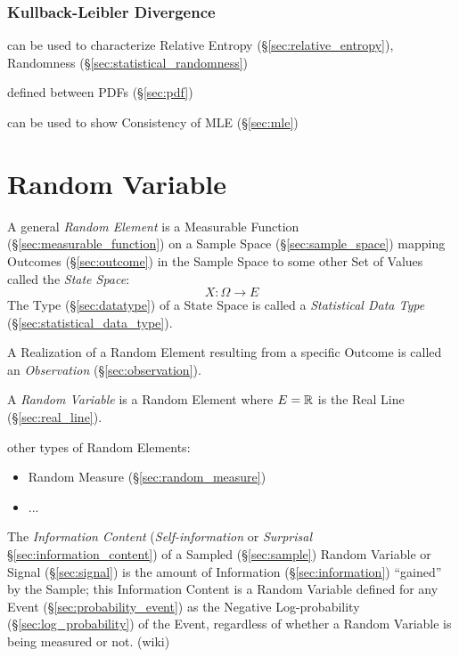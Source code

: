 \subsubsection{Kullback-Leibler Divergence}\label{sec:kullback_leibler}

can be used to characterize Relative Entropy (\S\ref{sec:relative_entropy}),
Randomness (\S\ref{sec:statistical_randomness})

defined between PDFs (\S\ref{sec:pdf})

can be used to show Consistency of MLE (\S\ref{sec:mle})



\section{Random Variable}\label{sec:random_variable}

A general \emph{Random Element} is a Measurable Function
(\S\ref{sec:measurable_function}) on a Sample Space (\S\ref{sec:sample_space})
mapping Outcomes (\S\ref{sec:outcome}) in the Sample Space to some other Set of
Values called the \emph{State Space}:
\[
  X : \Omega \rightarrow E
\]
The Type (\S\ref{sec:datatype}) of a State Space is called a \emph{Statistical
  Data Type} (\S\ref{sec:statistical_data_type}).

A Realization of a Random Element resulting from a specific Outcome is called an
\emph{Observation} (\S\ref{sec:observation}).

A \emph{Random Variable} is a Random Element where $E = \mathbb{R}$ is the Real Line
(\S\ref{sec:real_line}).

other types of Random Elements:
\begin{itemize}
  \item Random Measure (\S\ref{sec:random_measure})
  \item ...
\end{itemize}

The \emph{Information Content} (\emph{Self-information} or \emph{Surprisal}
\S\ref{sec:information_content}) of a Sampled (\S\ref{sec:sample}) Random
Variable or Signal (\S\ref{sec:signal}) is the amount of Information
(\S\ref{sec:information}) ``gained'' by the Sample; this Information Content is
a Random Variable defined for any Event (\S\ref{sec:probability_event}) as the
Negative Log-probability (\S\ref{sec:log_probability}) of the Event,
regardless of whether a Random Variable is being measured or not. (wiki)

